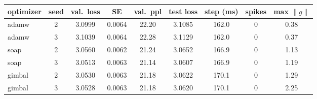 \begin{tabular}{lcccccccc}
\toprule
optimizer & seed & val.\ loss & SE & val.\ ppl & test loss & step (ms) & spikes & max $\|g\|$ \\
\midrule
adamw & 2 & 3.0999 & 0.0064 & 22.20 & 3.1085 & 162.0 & 0 & 0.38 \\
adamw & 3 & 3.1039 & 0.0064 & 22.28 & 3.1129 & 162.0 & 0 & 0.37 \\
soap & 2 & 3.0560 & 0.0062 & 21.24 & 3.0652 & 166.9 & 0 & 1.13 \\
soap & 3 & 3.0513 & 0.0063 & 21.14 & 3.0607 & 166.9 & 0 & 1.19 \\
gimbal & 2 & 3.0530 & 0.0063 & 21.18 & 3.0622 & 170.1 & 0 & 1.29 \\
gimbal & 3 & 3.0528 & 0.0063 & 21.18 & 3.0620 & 170.1 & 0 & 2.25 \\
\bottomrule
\end{tabular}
